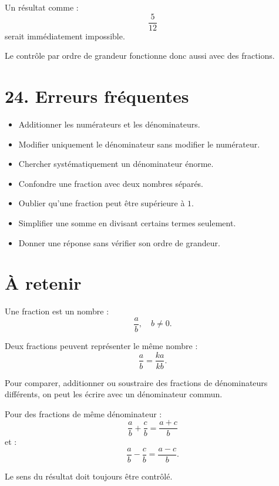 Un résultat comme :
\[
\dfrac5{12}
\]
serait immédiatement impossible.

Le contrôle par ordre de grandeur fonctionne donc aussi avec des fractions.

\section{24. Erreurs fréquentes}

\begin{itemize}
\item Additionner les numérateurs et les dénominateurs.
\item Modifier uniquement le dénominateur sans modifier le numérateur.
\item Chercher systématiquement un dénominateur énorme.
\item Confondre une fraction avec deux nombres séparés.
\item Oublier qu'une fraction peut être supérieure à $1$.
\item Simplifier une somme en divisant certains termes seulement.
\item Donner une réponse sans vérifier son ordre de grandeur.
\end{itemize}

\section{À retenir}

\begin{aretenir}
Une fraction est un nombre :
\[
\boxed{\dfrac ab,\quad b\neq0}.
\]

Deux fractions peuvent représenter le même nombre :
\[
\boxed{\dfrac ab=\dfrac{ka}{kb}}.
\]

Pour comparer, additionner ou soustraire des fractions de dénominateurs différents, on peut les écrire avec un dénominateur commun.

Pour des fractions de même dénominateur :
\[
\boxed{
\dfrac ab+\dfrac cb=\dfrac{a+c}{b}
}
\]
et :
\[
\boxed{
\dfrac ab-\dfrac cb=\dfrac{a-c}{b}
}.
\]

Le sens du résultat doit toujours être contrôlé.
\end{aretenir}
